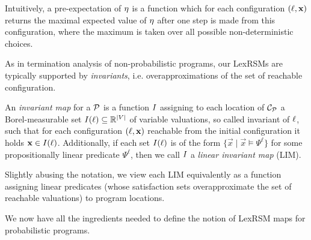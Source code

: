 Intuitively, a pre-expectation of $\eta$ is a 
function which for each configuration $(\ell,\mathbf{x})$ returns the maximal
expected value of $\eta$ after one step is made from this configuration, where 
the maximum is taken over all possible non-deterministic choices.

As in termination analysis of non-probabilistic programs, our LexRSMs are typically supported by \emph{invariants}, i.e. overapproximations of the set of reachable configuration. 

\begin{definition}
An \emph{invariant map} for a \PP{} $\mathcal{P}$ is a function $I$ assigning to each location of $\mathcal{C}_{\mathcal{P}}$ a Borel-measurable set $I({\ell})\subseteq \mathbb{R}^{|V|}$ of variable valuations, so called invariant of $\ell$, such that for each configuration $(\ell,\mathbf{x})$ reachable from the initial configuration it holds $\mathbf{x}\in I(\ell)$. Additionally, if each set $I(\ell)$ is of the form $\{\vec{x}\mid\vec{x}\models \Psi^\ell \}$ for some propositionally linear predicate $\Psi^\ell$, then we call $I$ a \emph{linear invariant map} (LIM).
\end{definition}

Slightly abusing the notation, we view each LIM equivalently as a function assigning linear predicates (whose satisfaction sets overapproximate the set of reachable valuations) to program locations.

We now have all the ingredients needed to define the notion of LexRSM maps for probabilistic programs.

